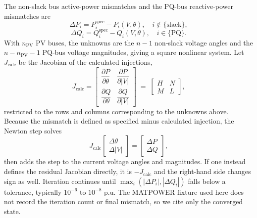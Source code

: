 \documentclass[11pt]{article}
\begin{document}
The non-slack bus active-power mismatches and the PQ-bus reactive-power
mismatches are
\[
  \Delta P_i = P_i^{\mathrm{spec}} - P_i(V,\theta), \quad i \notin \{\text{slack}\},
\]
\[
  \Delta Q_i = Q_i^{\mathrm{spec}} - Q_i(V,\theta), \quad i \in \{\text{PQ}\}.
\]
With $n_{\mathrm{PV}}$ PV buses, the unknowns are the $n - 1$ non-slack
voltage angles and the $n - n_{\mathrm{PV}} - 1$ PQ-bus voltage
magnitudes, giving a square nonlinear system. Let $J_{\mathrm{calc}}$ be
the Jacobian of the calculated injections,
\[
  J_{\mathrm{calc}} =
  \begin{bmatrix}
    \dfrac{\partial P}{\partial \theta} & \dfrac{\partial P}{\partial |V|} \\[6pt]
    \dfrac{\partial Q}{\partial \theta} & \dfrac{\partial Q}{\partial |V|}
  \end{bmatrix}
  \;=\;
  \begin{bmatrix} H & N \\ M & L \end{bmatrix},
\]
restricted to the rows and columns corresponding to the unknowns above.
Because the mismatch is defined as specified minus calculated injection,
the Newton step solves
\[
  J_{\mathrm{calc}}
  \begin{bmatrix} \Delta\theta \\ \Delta|V| \end{bmatrix}
  =
  \begin{bmatrix} \Delta P \\ \Delta Q \end{bmatrix},
\]
then adds the step to the current voltage angles and magnitudes. If one
instead defines the residual Jacobian directly, it is
$-J_{\mathrm{calc}}$ and the right-hand side changes sign as well.
Iteration continues until $\max_i (|\Delta P_i|, |\Delta Q_i|)$ falls
below a tolerance, typically $10^{-6}$ to $10^{-8}$ p.u. The MATPOWER
fixture used here does not record the iteration count or final mismatch,
so we cite only the converged state.
\end{document}
